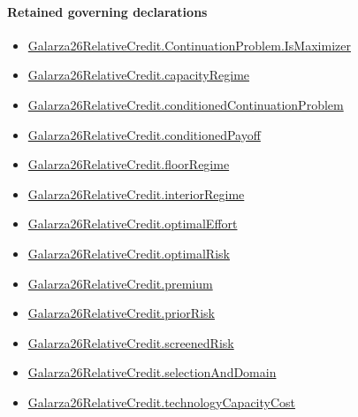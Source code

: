 \documentclass[10pt]{article}
\begin{document}
\paragraph{Retained governing declarations}
\begin{itemize}\raggedright
\item \hyperlink{governing-declaration-042b6300ffc11e3e}{Galarza26\allowbreak{}Relative\allowbreak{}Credit.\allowbreak{}Continuation\allowbreak{}Problem.\allowbreak{}Is\allowbreak{}Maximizer}
\item \hyperlink{governing-declaration-6e5d4449ad412574}{Galarza26\allowbreak{}Relative\allowbreak{}Credit.\allowbreak{}capacity\allowbreak{}Regime}
\item \hyperlink{paper-prerequisite-a6fae381e2d9a684}{Galarza26\allowbreak{}Relative\allowbreak{}Credit.\allowbreak{}conditioned\allowbreak{}Continuation\allowbreak{}Problem}
\item \hyperlink{paper-prerequisite-0bf7e0c122a51179}{Galarza26\allowbreak{}Relative\allowbreak{}Credit.\allowbreak{}conditioned\allowbreak{}Payoff}
\item \hyperlink{governing-declaration-65adc159d5a1934d}{Galarza26\allowbreak{}Relative\allowbreak{}Credit.\allowbreak{}floor\allowbreak{}Regime}
\item \hyperlink{governing-declaration-5f246d7c1bbfcd61}{Galarza26\allowbreak{}Relative\allowbreak{}Credit.\allowbreak{}interior\allowbreak{}Regime}
\item \hyperlink{governing-declaration-41e961e1975be029}{Galarza26\allowbreak{}Relative\allowbreak{}Credit.\allowbreak{}optimal\allowbreak{}Effort}
\item \hyperlink{governing-declaration-e139cf967ddac229}{Galarza26\allowbreak{}Relative\allowbreak{}Credit.\allowbreak{}optimal\allowbreak{}Risk}
\item \hyperlink{paper-prerequisite-6956aaccf5fffc8f}{Galarza26\allowbreak{}Relative\allowbreak{}Credit.\allowbreak{}premium}
\item \hyperlink{paper-prerequisite-e8657fe6a37f000a}{Galarza26\allowbreak{}Relative\allowbreak{}Credit.\allowbreak{}prior\allowbreak{}Risk}
\item \hyperlink{paper-prerequisite-e9553b2c455b69dd}{Galarza26\allowbreak{}Relative\allowbreak{}Credit.\allowbreak{}screened\allowbreak{}Risk}
\item \hyperlink{paper-prerequisite-ab0e2f9b84884bc6}{Galarza26\allowbreak{}Relative\allowbreak{}Credit.\allowbreak{}selection\allowbreak{}And\allowbreak{}Domain}
\item \hyperlink{paper-prerequisite-e5f9b7ce782f743a}{Galarza26\allowbreak{}Relative\allowbreak{}Credit.\allowbreak{}technology\allowbreak{}Capacity\allowbreak{}Cost}
\end{itemize}
\end{document}
